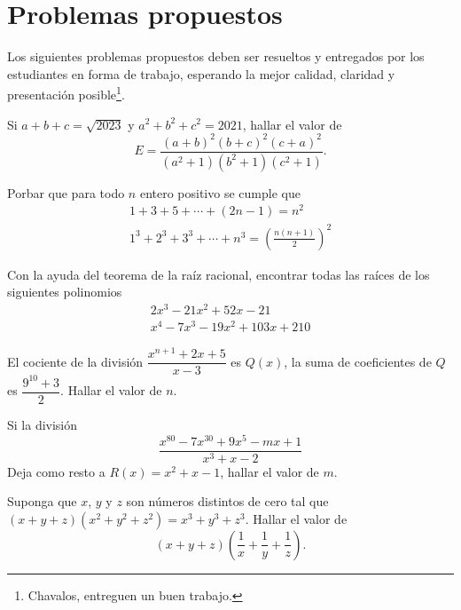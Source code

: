 \section{Problemas propuestos}


Los siguientes problemas propuestos deben ser resueltos y entregados por los estudiantes en forma de trabajo, esperando la mejor calidad, claridad y presentación posible\footnote{Chavalos, entreguen un buen trabajo.}.

\begin{section-problem}
    Si $a + b + c = \sqrt{2023}$ y $a^2 + b^2 + c^2 = 2021$, hallar el valor de
    \[E = \frac{(a + b)^2 (b + c)^2 (c + a)^2}{(a^2 + 1) (b^2 + 1) (c^2 + 1)}.\]
\end{section-problem}

\begin{section-problem}
    Porbar que para todo $n$ entero positivo se cumple que
    \begin{gather*}
        1 + 3 + 5 + \cdots + \left(2n - 1\right) = n^2\\
        1^3 + 2^3 + 3^3  + \cdots + n^3 = \left(\frac{n (n + 1)}{2}\right)^2
    \end{gather*}
\end{section-problem}

\begin{section-problem}
    Con la ayuda del teorema de la raíz racional, encontrar todas las raíces de los siguientes polinomios
    \begin{gather*}
        2 x^3 - 21 x^2 + 52 x - 21 \\
        x^4 - 7 x^3 - 19 x^2 + 103 x + 210
    \end{gather*}
\end{section-problem}

\begin{section-problem}
    El cociente de la división $\dfrac{x^{n + 1} + 2x + 5}{x - 3}$ es $Q(x)$, la suma de coeficientes de $Q$ es $\dfrac{9^{10} + 3}{2}$.
    Hallar el valor de $n$.
\end{section-problem}

\begin{section-problem}
    Si la división
    \[\frac{x^{80} - 7 x^{30} + 9x^5 - mx + 1}{x^3 + x - 2}\]
    Deja como resto a $R(x) = x^2 + x - 1$, hallar el valor de $m$.
\end{section-problem}

\begin{section-problem}
    Suponga que $x$, $y$ y $z$ son números distintos de cero tal que $(x + y + z)(x^2 + y^2 + z^2) = x^3 + y^3 + z^3$.
    Hallar el valor de
    \[(x + y + z)\left(\frac{1}{x} + \frac{1}{y} + \frac{1}{z}\right).\]
\end{section-problem}

